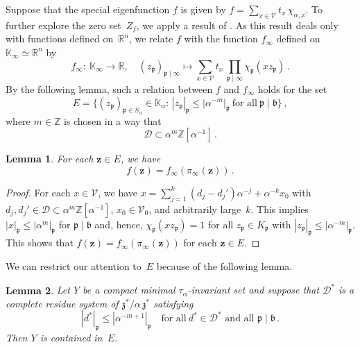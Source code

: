 \documentclass[12pt]{amsart}
\newtheorem{lemma}{Lemma}[section]
\theoremstyle{definition}
\theoremstyle{remark}
\numberwithin{equation}{section}
\begin{document}
Suppose that the special eigenfunction $f$ is given by $f = \sum_{x\in\mathcal{V}} t_x\, \chi_{\alpha,x}$.
To further explore the zero set~$Z_f$, we apply a result of \cite{Cerveau-Conze-Raugi:96}.
As this result deals only with functions defined on~$\mathbb{R}^n$, we relate $f$ with the function $f_\infty$ defined on~$\mathbb{K}_\infty \simeq \mathbb{R}^n$ by
\[
f_\infty:\ \mathbb{K}_\infty \to \mathbb{R}, \quad (z_\mathfrak{p})_{\mathfrak{p}\mid\infty} \mapsto \sum_{x\in\mathcal{V}} t_x\, \prod_{\mathfrak{p}\mid\infty} \chi_\mathfrak{p}(x z_\mathfrak{p})\,.
\]
By the following lemma, such a relation between $f$ and $f_\infty$ holds for the set
\begin{equation} \label{e:E}
E = \big\{(z_\mathfrak{p})_{\mathfrak{p}\in S_\alpha} \in \mathbb{K}_\alpha:\, |z_\mathfrak{p}|_\mathfrak{p} \le |\alpha^{-m}|_\mathfrak{p}\ \mbox{for all}\ \mathfrak{p} \mid \mathfrak{b}\}\,,
\end{equation}
where $m \in \mathbb{Z}$ is chosen in a way that
\begin{equation}\label{em}
\mathcal{D} \subset \alpha^{m}\mathbb{Z}[\alpha^{-1}]\,.
\end{equation}

\begin{lemma}\label{infinity}
For each $\mathbf{z} \in E$, we have
\[
f(\mathbf{z}) = f_\infty(\pi_\infty(\mathbf{z}))\,.
\]
\end{lemma}

\begin{proof}
For each $x \in \mathcal{V}$, we have $x = \sum_{j=1}^k (d_j - d_j') \alpha^{-j} + \alpha^{-k} x_0$ with $d_j, d_j' \in \mathcal{D} \subset \alpha^{m}\mathbb{Z}[\alpha^{-1}]$, $x_0 \in \mathcal{V}_0$, and arbitrarily large~$k$.
This implies $|x|_\mathfrak{p} \le |\alpha^m|_\mathfrak{p}$ for $\mathfrak{p} \mid \mathfrak{b}$ and, hence, $\chi_\mathfrak{p}(x z_\mathfrak{p}) = 1$ for all $z_\mathfrak{p} \in K_\mathfrak{p}$ with $|z_\mathfrak{p}|_\mathfrak{p} \le |\alpha^{-m}|_\mathfrak{p}$.
This shows that $f(\mathbf{z}) = f_\infty(\pi_\infty(\mathbf{z}))$ for each $\mathbf{z} \in E$.
\end{proof}

We can restrict our attention to~$E$ because of the following lemma.

\begin{lemma} \label{l:YE}
Let $Y$ be a compact  minimal $\tau_\alpha$-invariant set and suppose that $\mathcal{D}^*$ is a complete residue system of $\mathfrak{z}^* / \alpha\, \mathfrak{z}^*$ satisfying
\begin{equation} \label{em2}
|d^*|_\mathfrak{p} \le |\alpha^{-m+1}|_\mathfrak{p} \quad \mbox{for all}\ d^* \in \mathcal{D}^*\mbox{ and all } \mathfrak{p} \mid \mathfrak{b}\,.
\end{equation}
Then $Y$ is contained in~$E$.
\end{lemma}
\end{document}
